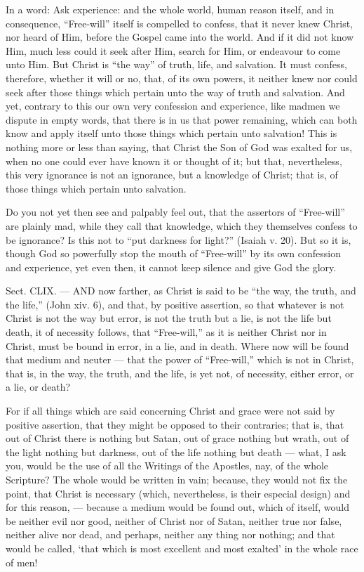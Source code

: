 In a word: Ask experience: and the whole world, human reason itself, and in consequence, “Free-will” itself is compelled to confess, that it never knew Christ, nor heard of Him, before the Gospel came into the world. And if it did not know Him, much less could it seek after Him, search for Him, or endeavour to come unto Him. But Christ is “the way” of truth, life, and salvation. It must confess, therefore, whether it will or no, that, of its own powers, it neither knew nor could seek after those things which pertain unto the way of truth and salvation. And yet, contrary to this our own very confession and experience, like madmen we dispute in empty words, that there is in us that power remaining, which can both know and apply itself unto those things which pertain unto salvation! This is nothing more or less than saying, that Christ the Son of God was exalted for us, when no one could ever have known it or thought of it; but that, nevertheless, this very ignorance is not an ignorance, but a knowledge of Christ; that is, of those things which pertain unto salvation.

Do you not yet then see and palpably feel out, that the assertors of “Free-will” are plainly mad, while they call that knowledge, which they themselves confess to be ignorance? Is this not to “put darkness for light?” (Isaiah v. 20). But so it is, though God so powerfully stop the mouth of “Free-will” by its own confession and experience, yet even then, it cannot keep silence and give God the glory.


Sect. CLIX. — AND now farther, as Christ is said to be “the way, the truth, and the life,” (John xiv. 6), and that, by positive assertion, so that whatever is not Christ is not the way but error, is not the truth but a lie, is not the life but death, it of necessity follows, that “Free-will,” as it is neither Christ nor in Christ, must be bound in error, in a lie, and in death. Where now will be found that medium and neuter — that the power of “Free-will,” which is not in Christ, that is, in the way, the truth, and the life, is yet not, of necessity, either error, or a lie, or death?

For if all things which are said concerning Christ and grace were not said by positive assertion, that they might be opposed to their contraries; that is, that out of Christ there is nothing but Satan, out of grace nothing but wrath, out of the light nothing but darkness, out of the life nothing but death — what, I ask you, would be the use of all the Writings of the Apostles, nay, of the whole Scripture? The whole would be written in vain; because, they would not fix the point, that Christ is necessary (which, nevertheless, is their especial design) and for this reason, — because a medium would be found out, which of itself, would be neither evil nor good, neither of Christ nor of Satan, neither true nor false, neither alive nor dead, and perhaps, neither any thing nor nothing; and that would be called, ‘that which is most excellent and most exalted’ in the whole race of men!

